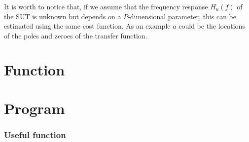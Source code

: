 \documentclass[a4paper, 12pt]{report}
\begin{document}
It is worth to notice that, if we assume that the frequency response $H_{u}(f)$ of the SUT is unknown but depends on a $P$-dimensional parameter, this can be estimated using the same cost function. As an example $a$ could be the locations of the poles and zeroes of the transfer function.
%
%

\appendix
\section{Function}

{\tiny }


\section{Program}

{\tiny }


\subsubsection{Useful function}

{\tiny }
\end{document}
